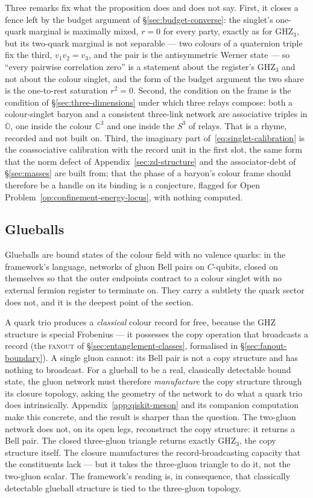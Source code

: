 Three remarks fix what the proposition does and does not say. First, it closes a fence left by the
budget argument of \S\ref{sec:budget-converse}: the singlet's one-quark marginal is maximally mixed,
$r = 0$ for every party, exactly as for $\mathrm{GHZ}_3$, but its two-quark marginal is not
separable --- two colours of a quaternion triple fix the third, $v_1 v_2 = v_3$, and the pair is the
antisymmetric Werner state --- so ``every pairwise correlation zero'' is a statement about the
register's $\mathrm{GHZ}_3$ and not about the colour singlet, and the form of the budget argument the
two share is the one-to-rest saturation $r^2 = 0$. Second, the condition on the frame is
the condition of \S\ref{sec:three-dimensions} under which three relays compose: both a
colour-singlet baryon and a consistent three-link network are associative triples in $\mathbb{O}$,
one inside the colour $\mathbb{C}^3$ and one inside the $S^3$ of relays. That is a rhyme, recorded
and not built on. Third, the imaginary part of~\eqref{eq:singlet-calibration} is the coassociative
calibration with the record unit in the first slot, the same form that the norm defect of
Appendix~\ref{sec:zd-structure} and the associator-debt of \S\ref{sec:masses} are built from; that
the phase of a baryon's colour frame should therefore be a handle on its binding is a conjecture,
flagged for Open Problem~\ref{op:confinement-energy-locus}, with nothing computed.

\subsection{Glueballs}

Glueballs are bound states of the colour field with no valence quarks: in the framework's language,
networks of gluon Bell pairs on $C$-qubits, closed on themselves so that the outer endpoints
contract to a colour singlet with no external fermion register to terminate on. They carry a subtlety
the quark sector does not, and it is the deepest point of the section.

A quark trio produces a \emph{classical} colour record for free, because the GHZ structure is special
Frobenius --- it possesses the copy operation that broadcasts a record (the \textsc{fanout} of
\S\ref{sec:entanglement-classes}, formalised in \S\ref{sec:fanout-boundary}). A single gluon cannot: its Bell pair is not a copy structure and
has nothing to broadcast. For a glueball to be a real, classically detectable bound state, the gluon
network must therefore \emph{manufacture} the copy structure through its closure topology, asking the
geometry of the network to do what a quark trio does intrinsically. Appendix~\ref{app:qiskit-meson}
and its companion computation make this concrete, and the result is sharper than the question. The
two-gluon network does not, on its open legs, reconstruct the copy structure: it returns a Bell pair.
The closed three-gluon triangle returns exactly $\mathrm{GHZ}_3$, the copy structure itself. The
closure manufactures the record-broadcasting capacity that the constituents lack --- but it takes the
three-gluon triangle to do it, not the two-gluon scalar. The framework's reading is, in consequence,
that classically detectable glueball structure is tied to the three-gluon topology.

